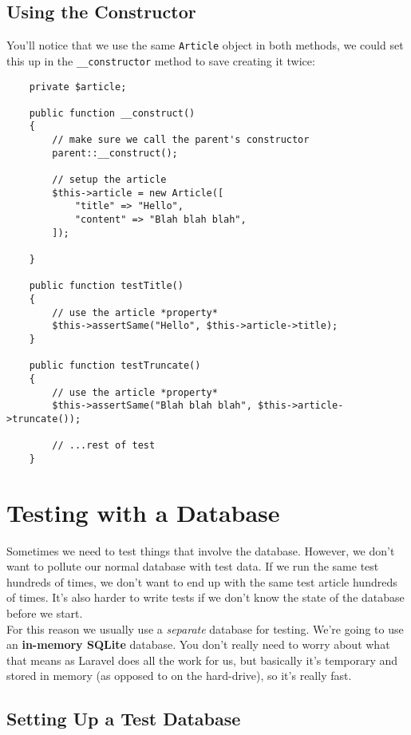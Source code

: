 \subsection{Using the Constructor}

You'll notice that we use the same \texttt{Article} object in both methods, we could set this up in the \texttt{\_\_constructor} method to save creating it twice:

\begin{verbatim}
    private $article;

    public function __construct()
    {
        // make sure we call the parent's constructor
        parent::__construct();

        // setup the article
        $this->article = new Article([
            "title" => "Hello",
            "content" => "Blah blah blah",
        ]);

    }

    public function testTitle()
    {
        // use the article *property*
        $this->assertSame("Hello", $this->article->title);
    }

    public function testTruncate()
    {
        // use the article *property*
        $this->assertSame("Blah blah blah", $this->article->truncate());

        // ...rest of test
    }
\end{verbatim}


\section{Testing with a Database}

Sometimes we need to test things that involve the database. However, we don't want to pollute our normal database with test data. If we run the same test hundreds of times, we don't want to end up with the same test article hundreds of times. It's also harder to write tests if we don't know the state of the database before we start.
\\

For this reason we usually use a \textit{separate} database for testing. We're going to use an \textbf{in-memory SQLite} database. You don't really need to worry about what that means as Laravel does all the work for us, but basically it's temporary and stored in memory (as opposed to on the hard-drive), so it's really fast.


\pagebreak


\subsection{Setting Up a Test Database}


